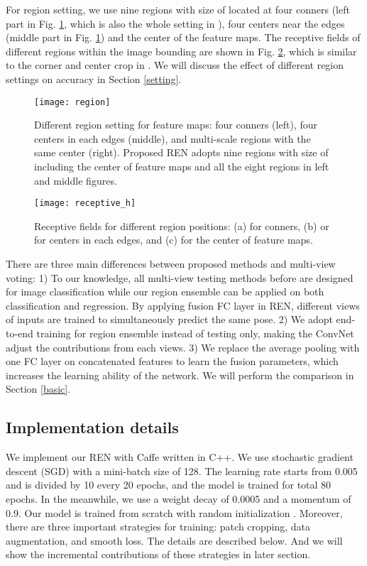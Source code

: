 \documentclass[10pt,twocolumn,letterpaper]{article}
\begin{document}
For region setting, we use nine regions with size of  located at four conners (left part in Fig. \ref{fig_region}, which is also the whole setting in \cite{guo2017region}), four centers near the edges (middle part in Fig. \ref{fig_region}) and the center of the feature maps. The receptive fields of different regions within the  image bounding are shown in Fig. \ref{fig_receptive}, which is similar to the corner and center crop in \cite{krizhevsky2012imagenet}. We will discuss the effect of different region settings on accuracy in Section \ref{setting}.

\begin{figure}[htb]
\centering
{\texttt{[image: region]}}
\caption{Different region setting for feature maps: four conners \cite{guo2017region} (left), four centers in each edges (middle), and multi-scale regions with the same center (right). Proposed REN adopts nine regions with size of  including the center of feature maps and all the eight regions in left and middle figures. }
\label{fig_region}
\end{figure}

\begin{figure}[htb]
\centering
{\texttt{[image: receptive\_h]}}
\caption{Receptive fields for different region positions: (a)  for conners, (b)  or  for centers in each edges, and (c)  for the center of feature maps.}
\label{fig_receptive}
\end{figure}

There are three main differences between proposed methods and multi-view voting: 1) To our knowledge, all multi-view testing methods before are designed for image classification while our region ensemble can be applied on both classification and regression. By applying fusion FC layer in REN, different views of inputs are trained to simultaneously predict the same pose. 2) We adopt end-to-end training for region ensemble instead of testing only, making the ConvNet adjust the contributions from each views. 3) We replace the average pooling with one FC layer on concatenated features to learn the fusion parameters, which increases the learning ability of the network. We will perform the comparison in Section \ref{basic}.

\subsection{Implementation details}
\label{detail}
We implement our REN with Caffe \cite{jia2014caffe} written in C++. We use stochastic gradient descent (SGD) with a mini-batch size of 128. The learning rate starts from 0.005 and is divided by 10 every 20 epochs, and the model is trained for total 80 epochs. In the meanwhile, we use a weight decay of 0.0005 and a momentum of 0.9. Our model is trained from scratch with random initialization \cite{he2015delving}. Moreover, there are three important strategies for training: patch cropping, data augmentation, and smooth  loss. The details are described below. And we will show the incremental contributions of these strategies in later section.
\end{document}
